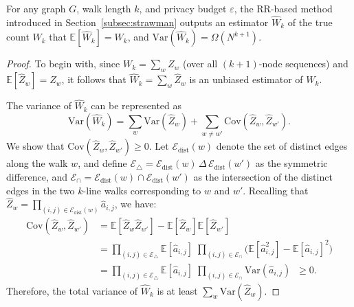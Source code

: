 
\begin{lemma}
For any graph $G$, walk length $k$, and privacy budget $\varepsilon$, the RR-based method introduced in Section~\ref{subsec:strawman} outputs an estimator $\hat{W}_k$ of the true count $W_k$ that $\mathbb{E}[\hat{W}_k] = W_k$,
and
$\mathrm{Var}(\hat{W}_k) = \Omega({N^{k+1}})$.
\end{lemma}


\begin{proof}
To begin with, since $W_k = \sum_w Z_w$ (over all $(k+1)$-node sequences) and $\mathbb{E}[\hat{Z}_w] = Z_w$, it follows that $\hat{W}_k = \sum_w \hat{Z}_w$ is an unbiased estimator of $W_k$. 


The variance of $\hat{W}_k$ can be represented as
\begin{equation*}
    \mathrm{Var}(\hat{W}_k) = \sum_w \mathrm{Var}(\hat{Z}_{w}) 
    + \sum_{w \neq w'} \mathrm{Cov}(\hat{Z}_{w}, \hat{Z}_{w'}).
\end{equation*}
We show that $\mathrm{Cov}(\hat{Z}_{w}, \hat{Z}_{w'}) \geq 0$.
Let $\mathcal{E}_{\mathrm{dist}}(w)$ denote the set of distinct edges along the walk $w$, and define  
$\mathcal{E}_\triangle = \mathcal{E}_{\mathrm{dist}}(w) \,\Delta\, \mathcal{E}_{\mathrm{dist}}(w')$  
as the symmetric difference, and  
$\mathcal{E}_\cap = \mathcal{E}_{\mathrm{dist}}(w) \cap \mathcal{E}_{\mathrm{dist}}(w')$  
as the intersection of the distinct edges in the two $k$-line walks corresponding to $w$ and $w'$.
Recalling that $ \hat{Z}_{w} = \prod_{(i,j)\in \mathcal{E}_{\mathrm{dist}}(w)} \hat{a}_{i,j}$,
we have:
\begin{align*}
\mathrm{Cov}(\hat{Z}_{w},\hat{Z}_{w'}) 
&= \mathbb{E}[\hat{Z}_{w} \hat{Z}_{w'}]-\mathbb{E}[\hat{Z}_{w}]\mathbb{E}[\hat{Z}_{w'}] \\
&= \prod_{(i,j)\in \mathcal{E}_\triangle} \mathbb{E}[\hat a_{i,j}]
   \;\prod_{(i,j)\in \mathcal{E}_\cap} 
   \bigl(\mathbb{E}[\hat a_{i,j}^2]-\mathbb{E}[\hat a_{i,j}]^2\bigr) \\[2pt]
&= \prod_{(i,j)\in \mathcal{E}_\triangle} \mathbb{E}[\hat a_{i,j}]
   \;\prod_{(i,j)\in \mathcal{E}_\cap} \mathrm{Var}(\hat a_{i,j})
   \;\;\ge 0.
\end{align*}
Therefore, the total variance of $\hat{W}_k$ is at least $\sum_w \mathrm{Var}(\hat{Z}_{w})$. 



\end{proof}
